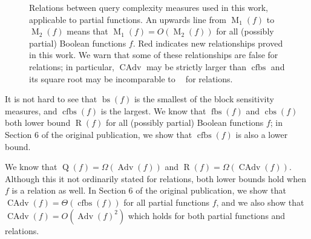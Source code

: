 \documentclass[10pt,a4paper]{article}
\theoremstyle{definition}
\renewcommand{\>}{\rangle}
\newcommand{\<}{\langle}
\DeclareMathOperator{\R}{R}
\DeclareMathOperator{\Q}{Q}
\DeclareMathOperator{\bs}{bs}
\DeclareMathOperator{\fbs}{fbs}
\DeclareMathOperator{\cbs}{cbs}
\DeclareMathOperator{\cfbs}{cfbs}
\DeclareMathOperator{\Adv}{Adv}
\DeclareMathOperator{\M}{M}
\DeclareMathOperator{\CAdv}{CAdv}
\DeclareMathOperator{\adeg}{\widetilde{\deg}}
\begin{document}
\begin{figure}
\centering
    \caption{Relations between query complexity
    measures used in this work, applicable to partial functions.
    An upwards line from $\M_1(f)$ to $\M_2(f)$ means
    that $\M_1(f)=O(\M_2(f))$ for all (possibly partial) Boolean
    functions $f$. {\color{red}Red} indicates new
    relationships proved in this work.
    We warn that some of these relationships
    are false for relations; in particular, $\CAdv$ may
    be strictly larger than $\cfbs$ and its square root
    may be incomparable to $\adeg$ for relations.
    \label{fig:relations}}
\end{figure}


It is not hard to see that $\bs(f)$ is the smallest
of the block sensitivity measures, and $\cfbs(f)$ is
the largest. We know \cite{Aar08,HN12}
that $\fbs(f)$ and $\cbs(f)$ both lower bound $\R(f)$
for all (possibly partial) Boolean functions $f$;
in Section 6 of the original publication, we show that $\cfbs(f)$ is also
a lower bound.

We know \cite{LM08,SS06,AKPV18} that
$\Q(f)=\Omega(\Adv(f))$ and $\R(f)=\Omega(\CAdv(f))$.
Although this it not ordinarily stated for relations,
both lower bounds hold when $f$ is a relation as well.
In Section 6 of the original publication, we show that
$\CAdv(f)=\Theta(\cfbs(f))$
for all partial functions $f$,
and we also show that
$\CAdv(f)=O(\Adv(f)^2)$
which holds for both partial functions and relations.
\end{document}
